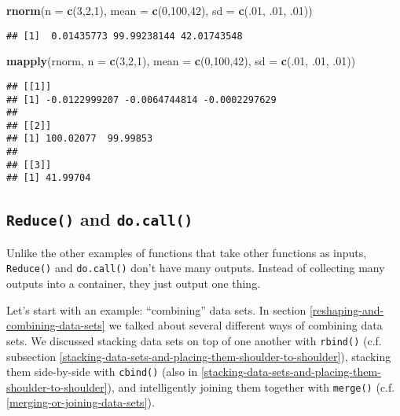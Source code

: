 \documentclass[12pt,krantz2]{krantz}
\makeatletter
\newenvironment{Shaded}{\begin{snugshade}}{\end{snugshade}}
\newcommand{\DataTypeTok}[1]{\textcolor[rgb]{0.27,0.27,0.27}{#1}}
\newcommand{\DecValTok}[1]{\textcolor[rgb]{0.06,0.06,0.06}{#1}}
\newcommand{\FloatTok}[1]{\textcolor[rgb]{0.06,0.06,0.06}{#1}}
\newcommand{\KeywordTok}[1]{\textcolor[rgb]{0.27,0.27,0.27}{\textbf{#1}}}
\newcommand{\NormalTok}[1]{#1}
\newenvironment{kframe}{%
\medskip{}
\setlength{\fboxsep}{.8em}
 \def\at@end@of@kframe{}%
 \ifinner\ifhmode%
  \def\at@end@of@kframe{\end{minipage}}%
  \begin{minipage}{\columnwidth}%
 \fi\fi%
 \def\FrameCommand##1{\hskip\@totalleftmargin \hskip-\fboxsep
 \colorbox{shadecolor}{##1}\hskip-\fboxsep
     \hskip-\linewidth \hskip-\@totalleftmargin \hskip\columnwidth}%
 \MakeFramed {\advance\hsize-\width
   \@totalleftmargin\z@ \linewidth\hsize
   \@setminipage}}%
 {\par\unskip\endMakeFramed%
 \at@end@of@kframe}
\renewenvironment{Shaded}{\begin{kframe}}{\end{kframe}}
\makeatother
\begin{document}
\begin{Shaded}
\begin{Highlighting}[]
\KeywordTok{rnorm}\NormalTok{(}\DataTypeTok{n =} \KeywordTok{c}\NormalTok{(}\DecValTok{3}\NormalTok{,}\DecValTok{2}\NormalTok{,}\DecValTok{1}\NormalTok{), }\DataTypeTok{mean =} \KeywordTok{c}\NormalTok{(}\DecValTok{0}\NormalTok{,}\DecValTok{100}\NormalTok{,}\DecValTok{42}\NormalTok{), }\DataTypeTok{sd =} \KeywordTok{c}\NormalTok{(.}\DecValTok{01}\NormalTok{, }\FloatTok{.01}\NormalTok{, }\FloatTok{.01}\NormalTok{))}
\end{Highlighting}
\end{Shaded}

\begin{verbatim}
## [1]  0.01435773 99.99238144 42.01743548
\end{verbatim}

\begin{Shaded}
\begin{Highlighting}[]
\KeywordTok{mapply}\NormalTok{(rnorm, }\DataTypeTok{n =} \KeywordTok{c}\NormalTok{(}\DecValTok{3}\NormalTok{,}\DecValTok{2}\NormalTok{,}\DecValTok{1}\NormalTok{), }\DataTypeTok{mean =} \KeywordTok{c}\NormalTok{(}\DecValTok{0}\NormalTok{,}\DecValTok{100}\NormalTok{,}\DecValTok{42}\NormalTok{), }\DataTypeTok{sd =} \KeywordTok{c}\NormalTok{(.}\DecValTok{01}\NormalTok{, }\FloatTok{.01}\NormalTok{, }\FloatTok{.01}\NormalTok{))}
\end{Highlighting}
\end{Shaded}

\begin{verbatim}
## [[1]]
## [1] -0.0122999207 -0.0064744814 -0.0002297629
## 
## [[2]]
## [1] 100.02077  99.99853
## 
## [[3]]
## [1] 41.99704
\end{verbatim}

\hypertarget{reduce-and-do.call}{%
\subsection{\texorpdfstring{\texttt{Reduce()} and \texttt{do.call()}}{Reduce() and do.call()}}\label{reduce-and-do.call}}

Unlike the other examples of functions that take other functions as inputs, \texttt{Reduce()} and \texttt{do.call()} don't have many outputs. Instead of collecting many outputs into a container, they just output one thing.

Let's start with an example: ``combining'' data sets. In section \ref{reshaping-and-combining-data-sets} we talked about several different ways of combining data sets. We discussed stacking data sets on top of one another with \texttt{rbind()} (c.f. subsection \ref{stacking-data-sets-and-placing-them-shoulder-to-shoulder}), stacking them side-by-side with \texttt{cbind()} (also in \ref{stacking-data-sets-and-placing-them-shoulder-to-shoulder}), and intelligently joining them together with \texttt{merge()} (c.f. \ref{merging-or-joining-data-sets}).
\end{document}
